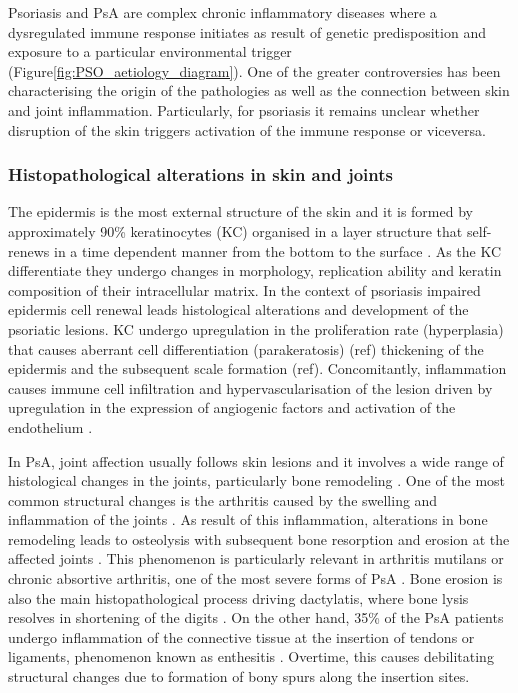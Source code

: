 Psoriasis and PsA are complex chronic inflammatory diseases where a dysregulated immune response initiates as result of genetic predisposition and exposure to a particular environmental trigger (Figure\ref{fig:PSO_aetiology_diagram}). One of the greater controversies has been characterising the origin of the pathologies as well as the connection between skin and joint inflammation. Particularly, for psoriasis it remains unclear whether disruption of the skin triggers activation of the immune response or viceversa.



\subsubsection*{Histopathological alterations in skin and joints}

The epidermis is the most external structure of the skin and it is formed by approximately 90\% keratinocytes (KC) organised in a layer structure that self-renews in a time dependent manner from the bottom to the surface \parencite{Wikramanayake2014}. As the KC differentiate they undergo changes in morphology, replication ability and keratin composition of their intracellular matrix. In the context of psoriasis impaired epidermis cell renewal leads histological alterations and development of the psoriatic lesions. KC undergo upregulation in the proliferation rate (hyperplasia) that causes aberrant cell differentiation (parakeratosis) (ref) thickening of the epidermis and the subsequent scale formation (ref). Concomitantly, inflammation causes immune cell infiltration and hypervascularisation of the lesion driven by upregulation in the expression of angiogenic factors and activation of the endothelium \parencite{Perera2012}. 

In PsA, joint affection usually follows skin lesions and it involves a wide range of histological changes in the joints, particularly bone remodeling \parencite{Haddad2013}. One of the most common structural changes is the arthritis caused by the swelling and inflammation of the joints \parencite{Schett2011}. As result of this inflammation, alterations in bone remodeling leads to osteolysis with subsequent bone resorption and erosion at the affected joints \parencite{Mensah2017}. This phenomenon is particularly relevant in arthritis mutilans or chronic absortive arthritis, one of the most severe forms of PsA \parencite{Haddad2013}. Bone erosion is also the main histopathological process driving dactylatis, where bone lysis resolves in shortening of the digits \parencite{Gladman2005}. On the other hand, 35\% of the PsA patients undergo inflammation of the connective tissue at the insertion of tendons or ligaments, phenomenon known as enthesitis \parencite{McGonagle2011,Polachek2017}. Overtime, this causes debilitating structural changes due to formation of bony spurs along the insertion sites\parencite{Schett2011}.


